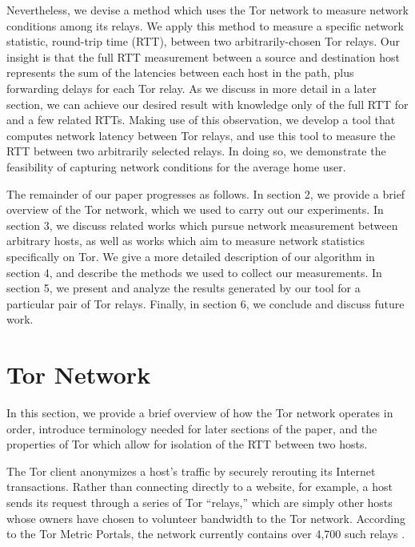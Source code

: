 \documentclass[twocolumn,11pt]{article}
\begin{document}
Nevertheless, we devise a method which uses the Tor network to measure network conditions among its relays. We apply this method to measure a specific network statistic, round-trip time (RTT), between two arbitrarily-chosen Tor relays. Our insight is that the full RTT measurement between a source and destination host represents the sum of the latencies between each host in the path, plus forwarding delays for each Tor relay. As we discuss in more detail in a later section, we can achieve our desired result with knowledge only of the full RTT for and a few related RTTs. Making use of this observation, we develop a tool that computes network latency between Tor relays, and use this tool to measure the RTT between two arbitrarily selected relays. In doing so, we demonstrate the feasibility of capturing network conditions for the average home user.

The remainder of our paper progresses as follows. In section 2, we provide a brief overview of the Tor network, which we used to carry out our experiments. In section 3, we discuss related works which pursue network measurement between arbitrary hosts, as well as works which aim to measure network statistics specifically on Tor. We give a more detailed description of our algorithm in section 4, and describe the methods we used to collect our measurements. In section 5, we present and analyze the results generated by our tool for a particular pair of Tor relays. Finally, in section 6, we conclude and discuss future work.

\section{Tor Network}

In this section, we provide a brief overview of how the Tor network operates in order, introduce terminology needed for later sections of the paper, and  the properties of Tor which allow for isolation of the RTT between two hosts. 

The Tor client anonymizes a host's traffic by securely rerouting its Internet transactions. Rather than connecting directly to a website, for example, a host sends its request through a series of Tor ``relays,'' which are simply other hosts whose owners have chosen to volunteer bandwidth to the Tor network. According to the Tor Metric Portals, the network currently contains over 4,700 such relays \cite{Tor_Metrics_Portal}.
\end{document}
